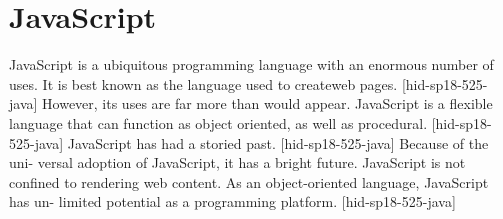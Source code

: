 \section{JavaScript}


JavaScript is a ubiquitous programming language with an
enormous number of uses. It is best known as the language
used to createweb pages. [hid-sp18-525-java] However, its 
uses are far more than would appear. JavaScript is a flexible 
language that can function as object oriented, as well as 
procedural. [hid-sp18-525-java] JavaScript has had a storied 
past. [hid-sp18-525-java] Because of the uni- versal adoption 
of JavaScript, it has a bright future. JavaScript is not 
confined to rendering web content. As an object-oriented 
language, JavaScript has un- limited potential as a 
programming platform. [hid-sp18-525-java]
